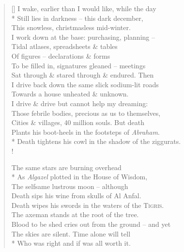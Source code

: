 \settowidth{\versewidth}{I wake, earlier than I would like, while the day}
\begin{verse}[\versewidth]
    I wake, earlier than I would like, while the day\\*
    Still lies in darkness -- this dark december,\\
    This snowless, christmasless mid-winter.\\
    I work down at the base: purchasing, planning --\\
    Tidal atlases, spreadsheets \& tables\\
    Of figures -- declarations \& forms\\
    To be filled in, signatures gleaned -- meetings\\
    Sat through \& stared through \& endured. Then\\
    I drive back down the same slick sodium-lit roads\\
    Towards a house unheated \& unknown.\\
    I drive \& drive but cannot help my dreaming:\\
    Those febrile bodies, precious as us to themselves,\\
    Cities \& villages, 40 million souls. But death\\
    Plants his boot-heels in the footsteps of \textit{Abraham}.\\*
    Death tightens his cowl in the shadow of the ziggurats.\\!

    The same stars are burning overhead\\*
    As \textit{Algazel} plotted in the House of Wisdom,\\
    The selfsame lustrous moon -- although\\
    Death sips his wine from skulls of Al Anfal.\\
    Death wipes his swords in the waters of the \textsc{Tigris}.\\
    The axeman stands at the root of the tree.\\
    Blood to be shed cries out from the ground -- and yet\\
    The skies are silent. Time alone will tell\\*
    Who was right and if was all worth it.
\end{verse}
